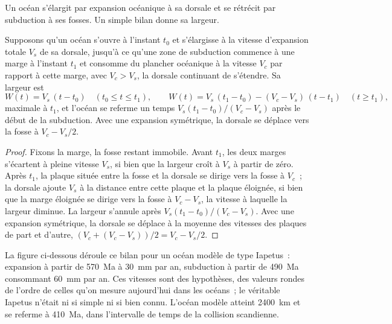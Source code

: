 Un océan s'élargit par expansion océanique à sa dorsale et se rétrécit par subduction à ses fosses.
Un simple bilan donne sa largeur.

\begin{proposition}\label{prop:b2:wilson-cycle:width}
Supposons qu'un océan s'ouvre à l'instant $t_0$ et s'élargisse à la vitesse d'expansion totale $V_s$ de sa
dorsale, jusqu'à ce qu'une zone de subduction commence à une marge à l'instant $t_1$ et consomme du plancher océanique à la vitesse $V_c$
par rapport à cette marge, avec $V_c > V_s$, la dorsale continuant de s'étendre. Sa largeur est
\[
  W(t) = V_s\,(t - t_0) \quad (t_0 \le t \le t_1), \qquad
  W(t) = V_s\,(t_1 - t_0) - (V_c - V_s)\,(t - t_1) \quad (t \ge t_1),
\]
maximale à $t_1$, et l'océan se referme un temps $V_s(t_1 - t_0)/(V_c - V_s)$ après le début de la
subduction. Avec une expansion symétrique, la dorsale se déplace vers la fosse à $V_c - V_s/2$.
\end{proposition}

\begin{proof}
Fixons la marge, la fosse restant immobile. Avant $t_1$, les deux marges s'écartent à pleine
vitesse $V_s$, si bien que la largeur croît à $V_s$ à partir de zéro. Après $t_1$, la plaque située entre
la fosse et la dorsale se dirige vers la fosse à $V_c$~; la dorsale ajoute $V_s$ à la distance
entre cette plaque et la plaque éloignée, si bien que la marge éloignée se dirige vers la fosse à $V_c - V_s$,
la vitesse à laquelle la largeur diminue. La largeur s'annule après $V_s(t_1 - t_0)/(V_c -
V_s)$. Avec une expansion symétrique, la dorsale se déplace à la moyenne des vitesses des plaques de
part et d'autre, $(V_c + (V_c - V_s))/2 = V_c - V_s/2$.
\end{proof}

La figure ci-dessous déroule ce bilan pour un océan modèle de type Iapetus~: expansion à partir de
\qty{570}{Ma} à \qty{30}{mm} par an, subduction à partir de \qty{490}{Ma} consommant \qty{60}{mm}
par an. Ces vitesses sont des hypothèses, des valeurs rondes de l'ordre de celles qu'on mesure aujourd'hui dans les océans~; le
véritable Iapetus n'était ni si simple ni si bien connu. L'océan modèle atteint \qty{2400}{km}
et se referme à \qty{410}{Ma}, dans l'intervalle de temps de la collision scandienne.

